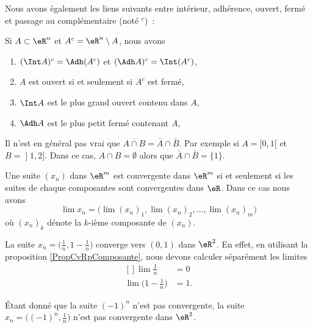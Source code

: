 Nous avons également les liens suivants entre intérieur, adhérence,
ouvert, fermé et passage au complémentaire (noté ${}^c$)~:
\begin{proposition}
Si $A \subset \eR^n$ et $A^c = \eR^n\setminus A$, nous
  avons
  \begin{enumerate}
  \item $(\Int A)^c = \Adh (A^c)$ et $(\Adh A)^c = \Int
    (A^c)$,
  \item $A$ est ouvert si et seulement si $A^c$ est fermé,
  \item $\Int A$ est le plus grand ouvert contenu dans $A$,
  \item $\Adh A$ est le plus petit fermé contenant $A$,
  \end{enumerate}
\end{proposition}

\begin{example} \label{ExBFLooUNyvbw}
    Il n'est en général pas vrai que \( \overline{ A\cap B }=\bar A\cap \bar B\). Par exemple si \( A=\mathopen[ 0 , 1 [\) et \( B=\mathopen] 1 , 2 \mathclose]\). Dans ce cas, \( A\cap B=\emptyset\) alors que \( \bar A\cap\bar B=\{ 1 \}\).
\end{example}

\begin{proposition}		\label{PropCvRpComposante}
	Une suite $(x_n)$ dans $\eR^m$ est convergente dans $\eR^m$ si et seulement si les suites de chaque composantes sont convergentes dans $\eR$. Dans ce cas nous avons
	 \begin{equation}
		 \lim x_n=\Big( \lim(x_n)_1,\lim (x_n)_2,\ldots,\lim (x_n)_m \Big)
	 \end{equation}
	 où $(x_n)_k$ dénote la $k$-ième composante de $(x_n)$.
\end{proposition}

\begin{example}
	La suite $x_n=\big( \frac{1}{ n },1-\frac{1}{ n } \big)$ converge vers $(0,1)$ dans $\eR^2$. En effet, en utilisant la proposition \ref{PropCvRpComposante}, nous devons calculer séparément les limites
	\begin{equation}
		\begin{aligned}[]
			\lim\frac{1}{ n }&=0\\
			\lim\big( 1-\frac{1}{ n } \big)&=1.
		\end{aligned}
	\end{equation}
\end{example}

\begin{example}
	Étant donné que la suite $(-1)^n$ n'est pas convergente, la suite $x_n=\big( (-1)^n,\frac{1}{ n } \big)$ n'est pas convergente dans $\eR^2$.
\end{example}

